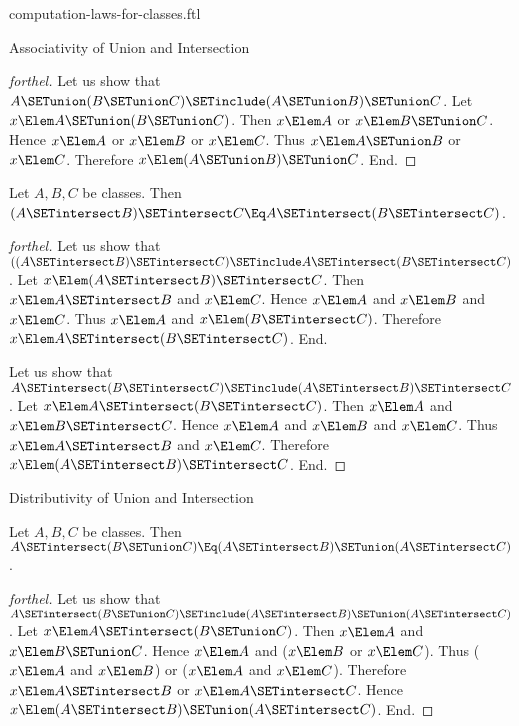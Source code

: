 \documentclass{stex}
\begin{document}
\begin{smodule}{computation-laws-for-classes.ftl}
\begin{sfragment}{Associativity of Union and Intersection}
\begin{proof}[forthel]
    Let us show that $A \SETunion (B \SETunion C) \SETinclude (A \SETunion B) \SETunion C$.
      Let $x \Elem A \SETunion (B \SETunion C)$.
      Then $x \Elem A$ or $x \Elem B \SETunion C$.
      Hence $x \Elem A$ or $x \Elem B$ or $x \Elem C$.
      Thus $x \Elem A \SETunion B$ or $x \Elem C$.
      Therefore $x \Elem (A \SETunion B) \SETunion C$.
    End.
  \end{proof}

  \begin{proposition}[forthel,id=FOUNDATIONS_02_906751977193472]
    Let $A, B, C$ be classes.
    Then $(A \SETintersect B) \SETintersect C \Eq A \SETintersect (B \SETintersect C)$.
  \end{proposition}
  \begin{proof}[forthel]
    Let us show that $((A \SETintersect B) \SETintersect C) \SETinclude A \SETintersect (B \SETintersect C)$. %
      Let $x \Elem (A \SETintersect B) \SETintersect C$.
      Then $x \Elem A \SETintersect B$ and $x \Elem C$.
      Hence $x \Elem A$ and $x \Elem B$ and $x \Elem C$.
      Thus $x \Elem A$ and $x \Elem (B \SETintersect C)$.
      Therefore$ x \Elem A \SETintersect (B \SETintersect C)$.
    End.

    Let us show that $A \SETintersect (B \SETintersect C) \SETinclude (A \SETintersect B) \SETintersect C$.
      Let $x \Elem A \SETintersect (B \SETintersect C)$.
      Then $x \Elem A$ and $x \Elem B \SETintersect C$.
      Hence $x \Elem A$ and $x \Elem B$ and $x \Elem C$.
      Thus $x \Elem A \SETintersect B$ and $x \Elem C$.
      Therefore $x \Elem (A \SETintersect B) \SETintersect C$.
    End.
  \end{proof}
\end{sfragment}

\begin{sfragment}{Distributivity of Union and Intersection}
  \begin{proposition}[forthel,id=FOUNDATIONS_02_371139087958016]
    Let $A, B, C$ be classes.
    Then $A \SETintersect (B \SETunion C) \Eq (A \SETintersect B) \SETunion (A \SETintersect C)$.
  \end{proposition}
  \begin{proof}[forthel]
    Let us show that $A \SETintersect (B \SETunion C) \SETinclude (A \SETintersect B) \SETunion (A \SETintersect C)$.
      Let $x \Elem A \SETintersect (B \SETunion C)$.
      Then $x \Elem A$ and $x \Elem B \SETunion C$.
      Hence $x \Elem A$ and ($x \Elem B$ or $x \Elem C$).
      Thus ($x \Elem A$ and $x \Elem B$) or ($x \Elem A$ and $x \Elem C$).
      Therefore $x \Elem A \SETintersect B$ or $x \Elem A \SETintersect C$.
      Hence $x \Elem (A \SETintersect B) \SETunion (A \SETintersect C)$.
    End.


\end{proof}
\end{sfragment}
\end{smodule}
\end{document}
